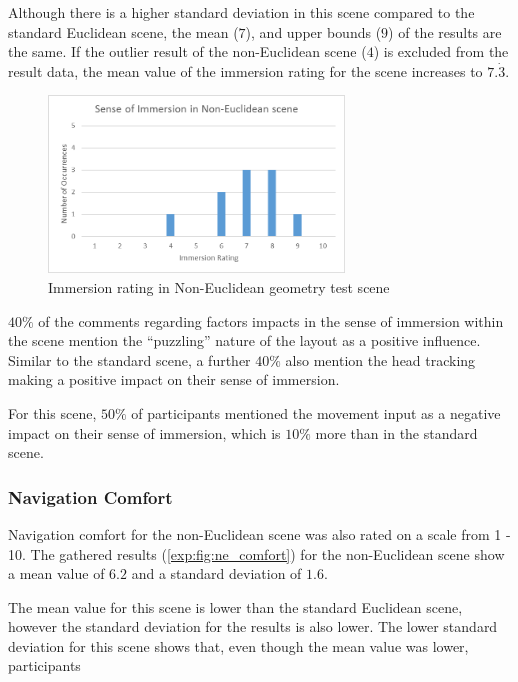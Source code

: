 				Although there is a higher standard deviation in this scene compared to the standard Euclidean scene, the mean ($7$), and upper bounds ($9$) of the results are the same.
				If the outlier result of the non-Euclidean scene ($4$) is excluded from the result data, the mean value of the immersion rating for the scene increases to $7.\dot{3}$.

				\begin{figure}[h]
					\includegraphics[width=0.7\textwidth]{Images/NE_Immersion}
					\centering
					\caption{Immersion rating in Non-Euclidean geometry test scene}
					\label{exp:fig:ne_immersion}
				\end{figure}

				$40\%$ of the comments regarding factors impacts in the sense of immersion within the scene mention the \enquote{puzzling} nature of the layout as a positive influence.
				Similar to the standard scene, a further $40\%$ also mention the head tracking making a positive impact on their sense of immersion.

				For this scene, $50\%$ of participants mentioned the movement input as a negative impact on their sense of immersion, which is $10\%$ more than in the standard scene.

			\subsubsection{Navigation Comfort}

				Navigation comfort for the non-Euclidean scene was also rated on a scale from 1 - 10.
				The gathered results (\autoref{exp:fig:ne_comfort}) for the non-Euclidean scene show a mean value of $6.2$ and a standard deviation of $1.6$.

				The mean value for this scene is lower than the standard Euclidean scene, however the standard deviation for the results is also lower.
				The lower standard deviation for this scene shows that, even though the mean value was lower, participants %

